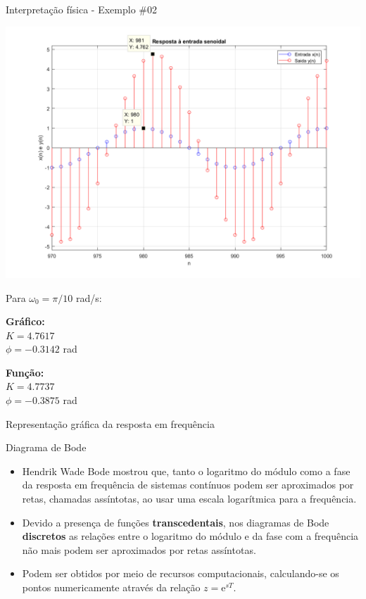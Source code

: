 \begin{frame}{Interpretação física - Exemplo \#02}
\centerline{\includegraphics[width=0.7\linewidth]{Figuras/Ch13/fig3.png}}
\vspace{-0.35cm}
	\begin{block}{Para $ \omega_{0} = \pi/10 $ rad/s:}
\begin{minipage}[t]{0.48\linewidth}
    \centering
        \textbf{Gráfico:}\\
	    $ K = \num{4,7617} $ \\
	    $ \phi = -\num{0,3142} $ rad \\
\end{minipage}\hfill
\begin{minipage}[t]{0.48\linewidth}
    \centering
        \textbf{Função:}\\
	    $ K = \num{4,7737} $ \\
	    $ \phi = -\num{0,3875} $ rad \\
\end{minipage}
\end{block}
\end{frame}

\begin{frame}{Representação gráfica da resposta em frequência}
    \begin{block}{Diagrama de Bode}
    \begin{itemize}
        \item Hendrik Wade Bode mostrou que, tanto o logaritmo do módulo como a fase da  resposta em frequência de sistemas contínuos  podem ser aproximados por retas, chamadas  assíntotas, ao usar uma escala logarítmica  para a frequência.
        \item Devido a presença de funções \textbf{transcedentais}, nos diagramas de Bode \textbf{discretos} as relações  entre o logaritmo do módulo e da fase com  a frequência não mais podem ser aproximados por retas assíntotas.
        \item Podem ser obtidos por meio de recursos computacionais, calculando-se os pontos numericamente através da relação $ z = \text{e}^{sT} $.
    \end{itemize}
    \end{block}
\end{frame}

